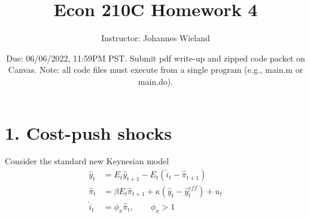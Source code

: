 \documentclass{article}
\newcommand{\1}{\mathbf{1}}
\begin{document}
\title{Econ 210C Homework 4}
\author{Instructor: Johannes Wieland}
\date{\color{red} Due: 06/06/2022, 11:59PM PST. Submit pdf write-up and zipped code packet on Canvas. Note: all code files must execute from a single program (e.g., main.m or main.do).}
\maketitle



\section*{1. Cost-push shocks}
Consider the standard new Keynesian model 
\begin{align}
	\hat{y}_{t}&=E_{t}\hat{y}_{t+1} - E_{t}(\hat{i}_{t}-\hat{\pi}_{t+1}) \label{nk1} \\
	\hat{\pi}_{t}&=\beta E_{t}\hat{\pi}_{t+1} +\kappa (\hat{y}_{t}-\hat{y}_{t}^{eff}) + u_t \label{nk2} \\
	\hat{i}_{t}&=\phi_\pi \hat{\pi}_t,\qquad \phi_\pi>1 \label{nk3}
\end{align}
\end{document}
